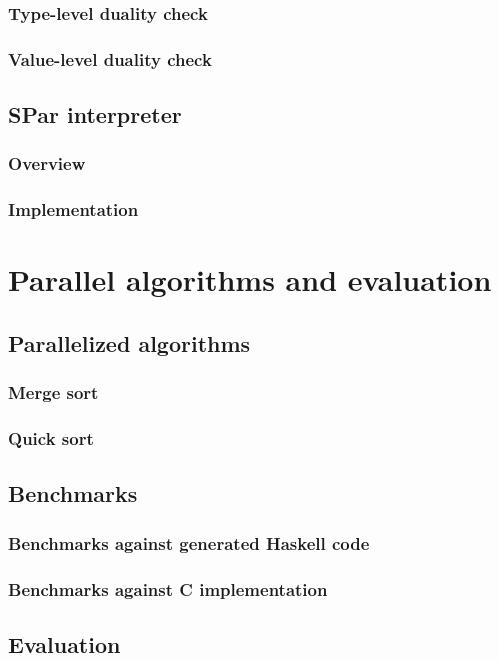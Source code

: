 \documentclass[a4paper, twoside]{report}
\begin{document}
\subsection{Type-level duality check}
\subsection{Value-level duality check}
\section{SPar interpreter}
\subsection{Overview}
\subsection{Implementation}




% 
\chapter{Parallel algorithms and evaluation} \label{eval}
\section{Parallelized algorithms}
\subsection{Merge sort}
\subsection{Quick sort}
\section{Benchmarks}
\subsection{Benchmarks against generated Haskell code}
\subsection{Benchmarks against C implementation}
\section{Evaluation}
\end{document}
